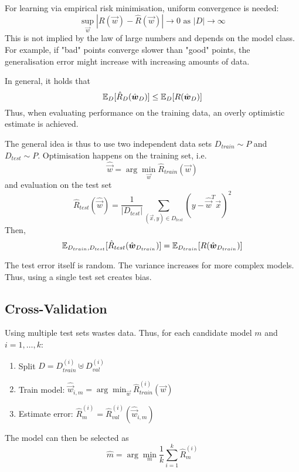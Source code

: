 For learning via empirical risk minimisation,
uniform convergence is needed:
\begin{equation*}
\sup_{\vec{w}}{|R(\vec{w}) - \hat{R}(\vec{w})|} \to 0
\text{ as $|D| \to \infty$}
\end{equation*}
This is not implied by the law of large numbers
and depends on the model class.
For example, if "bad" points converge slower than
"good" points, the generalisation error might increase
with increasing amounts of data.

In general, it holds that
\begin{equation*}
\mathbb{E}_D[\hat{R}_D(\hat{\boldsymbol{w}}_D)] \leq
\mathbb{E}_D[R(\hat{\boldsymbol{w}}_D)]
\end{equation*}
Thus, when evaluating performance on the training data,
an overly optimistic estimate is achieved.

The general idea is thus to use two independent data sets
$D_{train} \sim P$ and $D_{test} \sim P$.
Optimisation happens on the training set, i.e.
\begin{equation*}
\hat{\vec{w}} = \arg\min_{\vec{w}}{\hat{R}_{train}(\vec{w})}
\end{equation*}
and evaluation on the test set
\begin{equation*}
\hat{R}_{test}(\hat{\vec{w}}) = \frac{1}{|D_{test}|}
\sum_{(\vec{x}, y) \in D_{test}}{
	(y - \hat{\vec{w}}^T \vec{x})^2
}
\end{equation*}
Then,
\begin{equation*}
\mathbb{E}_{D_{train}, D_{test}}[\hat{R}_{test}(\hat{\boldsymbol{w}}_{D_{train}})] =
\mathbb{E}_{D_{train}}[R(\hat{\boldsymbol{w}}_{D_{train}})]
\end{equation*}

The test error itself is random.
The variance increases for more complex models.
Thus, using a single test set creates bias.


\subsection{Cross-Validation}
Using multiple test sets wastes data.
Thus, for each candidate model $m$
and $i = 1, \dotsc, k$:
\begin{enumerate}
	\item Split $D = D_{train}^{(i)} \uplus D_{val}^{(i)}$
	\item Train model:
	$\hat{\vec{w}}_{i,m} = \arg\min_{\vec{w}}{\hat{R}_{train}^{(i)}(\vec{w})}$
	\item Estimate error:
	$\hat{R}_{m}^{(i)} = \hat{R}_{val}^{(i)}(\hat{\vec{w}}_{i, m})$
\end{enumerate}
The model can then be selected as
\begin{equation*}
\hat{m} = \arg\min_m{\frac{1}{k}
	\sum_{i=1}^k{\hat{R}_m^{(i)}}
}
\end{equation*}

